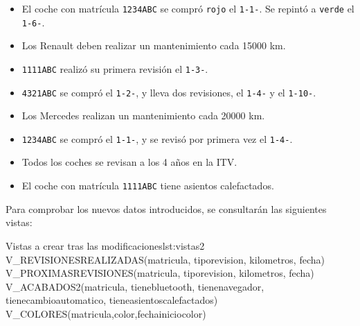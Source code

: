 \begin{homeworkProblem}

  \begin{itemize}
  \item El coche con matrícula \texttt{1234ABC} se compró \texttt{rojo} el \texttt{1-1-\anio}. Se repintó a \texttt{verde} el \texttt{1-6-\anio}.
  \item  Los Renault deben realizar un mantenimiento cada 15000 km.
    
  \item \texttt{1111ABC} realizó su primera revisión el \texttt{1-3-\anio}.
  \item \texttt{4321ABC} se compró el \texttt{1-2-\anio}, y lleva dos revisiones, el \texttt{1-4-\anio} y el \texttt{1-10-\anio}.

  \item Los Mercedes realizan un mantenimiento cada 20000 km. 
  \item \texttt{1234ABC}   se compró el \texttt{1-1-\anio}, y se revisó por primera vez el \texttt{1-4-\anio}.
  \item Todos los coches se revisan a los 4 años en la ITV.
  \item El coche con matrícula \texttt{1111ABC} tiene asientos calefactados.
  \end{itemize}

  Para comprobar los nuevos datos introducidos, se consultarán las siguientes vistas:
  
  \begin{listadosql}{Vistas a crear tras las modificaciones}{lst:vistas2}
  V_REVISIONESREALIZADAS(matricula, tiporevision, kilometros, fecha)
  V_PROXIMASREVISIONES(matricula, tiporevision, kilometros, fecha)
  V_ACABADOS2(matricula, tienebluetooth, tienenavegador, tienecambioautomatico, tieneasientoscalefactados)
  V_COLORES(matricula,color,fechainiciocolor)
  \end{listadosql}

\end{homeworkProblem}

